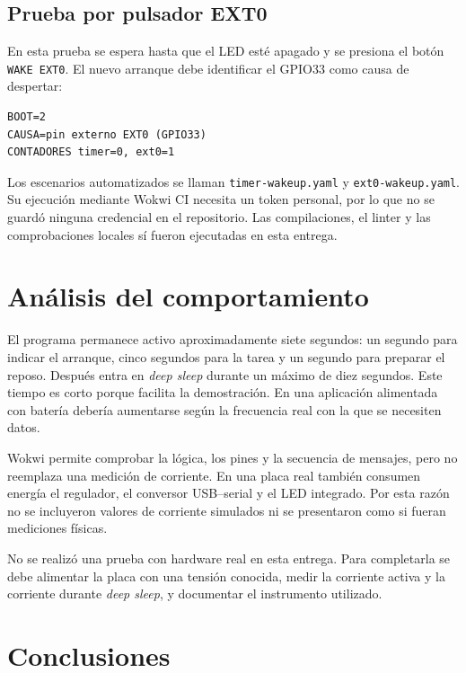 \documentclass{article}
\begin{document}
\subsection{Prueba por pulsador EXT0}

En esta prueba se espera hasta que el LED esté apagado y se presiona el botón \texttt{WAKE EXT0}. El nuevo arranque debe identificar el GPIO33 como causa de despertar:

\begin{lstlisting}[language={}]
BOOT=2
CAUSA=pin externo EXT0 (GPIO33)
CONTADORES timer=0, ext0=1
\end{lstlisting}

Los escenarios automatizados se llaman \texttt{timer-wakeup.yaml} y \texttt{ext0-wakeup.yaml}. Su ejecución mediante Wokwi CI necesita un token personal, por lo que no se guardó ninguna credencial en el repositorio. Las compilaciones, el linter y las comprobaciones locales sí fueron ejecutadas en esta entrega.

\section{Análisis del comportamiento}

El programa permanece activo aproximadamente siete segundos: un segundo para indicar el arranque, cinco segundos para la tarea y un segundo para preparar el reposo. Después entra en \textit{deep sleep} durante un máximo de diez segundos. Este tiempo es corto porque facilita la demostración. En una aplicación alimentada con batería debería aumentarse según la frecuencia real con la que se necesiten datos.

Wokwi permite comprobar la lógica, los pines y la secuencia de mensajes, pero no reemplaza una medición de corriente. En una placa real también consumen energía el regulador, el conversor USB--serial y el LED integrado. Por esta razón no se incluyeron valores de corriente simulados ni se presentaron como si fueran mediciones físicas.

No se realizó una prueba con hardware real en esta entrega. Para completarla se debe alimentar la placa con una tensión conocida, medir la corriente activa y la corriente durante \textit{deep sleep}, y documentar el instrumento utilizado.

\section{Conclusiones}
\end{document}
